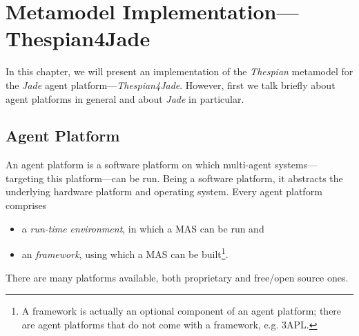 
\chapter{Metamodel Implementation---Thespian4Jade}

In this chapter, we will present an implementation of the \textit{Thespian} metamodel for the \textit{Jade} agent platform---\textit{Thespian4Jade}.
However, first we talk briefly about agent platforms in general and about \textit{Jade} in particular. 

\section{Agent Platform}

An agent platform is a software platform on which multi-agent systems---targeting this platform---can be run.
Being a software platform, it abstracts the underlying hardware platform and operating system.
Every agent platform comprises
\begin{itemize}
	\item a \textit{run-time environment}, in which a MAS can be run and
	\item an \textit{framework}, using which a MAS can be built\footnote{A framework is actually an optional component of an agent platform; there are agent platforms that do not come with a framework, e.g. 3APL.}.
\end{itemize}
There are many platforms available, both proprietary and free/open source ones.

